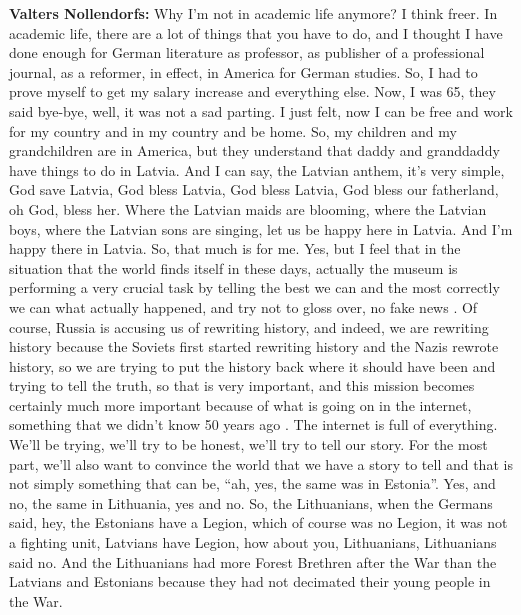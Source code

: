\textbf{Valters Nollendorfs:} Why I'm not in academic life anymore? I think freer. In academic life, there are a lot of things that you have to do, and I thought I have done enough for German literature as professor, as publisher of a professional journal, as a reformer, in effect, in America for German studies. So, I had to prove myself to get my salary increase and everything else. Now, I was 65, they said bye-bye, well, it was not a sad parting. I just felt, now I can be free and work for my country and in my country and be home. So, my children and my grandchildren are in America, but they understand that daddy and granddaddy have things to do in Latvia. And I can say, the Latvian anthem, it’s very simple, God save Latvia, God bless Latvia, God bless Latvia, God bless our fatherland, oh God, bless her. Where the Latvian maids are blooming, where the Latvian boys, where the Latvian sons are singing, let us be happy here in Latvia. And I'm happy there in Latvia. So, that much is for me. Yes, but I feel that in the situation that the world finds itself in these days, actually the museum is performing a very crucial task by telling the best we can and the most correctly we can what actually happened, and try not to gloss over, no fake news . Of course, Russia is accusing us of rewriting history, and indeed, we are rewriting history because the Soviets first started rewriting history and the Nazis rewrote history, so we are trying to put the history back where it should have been and trying to tell the truth, so that is very important, and this mission becomes certainly much more important because of what is going on in the internet, something that we didn’t know 50 years ago . The internet is full of everything. We’ll be trying, we’ll try to be honest, we’ll try to tell our story. For the most part, we’ll also want to convince the world that we have a story to tell and that is not simply something that can be, ``ah, yes, the same was in Estonia''. Yes, and no, the same in Lithuania, yes and no. So, the Lithuanians, when the Germans said, hey, the Estonians have a Legion, which of course was no Legion, it was not a fighting unit, Latvians have Legion, how about you, Lithuanians, Lithuanians said no. And the Lithuanians had more Forest Brethren after the War than the Latvians and Estonians because they had not decimated their young people in the War. 
